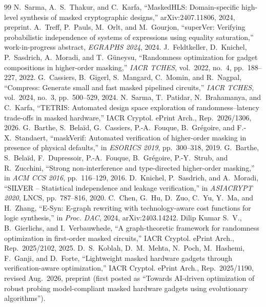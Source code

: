 \documentclass[conference]{IEEEtran}
\begin{document}
\begin{thebibliography}{99}
 N.~Sarma, A.~S.~Thakur, and C.~Karfa, ``MaskedHLS: Domain-specific high-level synthesis of masked cryptographic designs,'' arXiv:2407.11806, 2024, preprint. %
 A.~Treff, P.~Pauls, M.~Orlt, and M.~Gourjon, ``superVer: Verifying probabilistic independence of systems of expressions using equality saturation,'' work-in-progress abstract, \emph{EGRAPHS 2024}, 2024.
 J.~Feldtkeller, D.~Knichel, P.~Sasdrich, A.~Moradi, and T.~G\"uneysu, ``Randomness optimization for gadget compositions in higher-order masking,'' \emph{IACR TCHES}, vol.~2022, no.~4, pp.~188--227, 2022.
 G.~Cassiers, B.~Gigerl, S.~Mangard, C.~Momin, and R.~Nagpal, ``Compress: Generate small and fast masked pipelined circuits,'' \emph{IACR TCHES}, vol.~2024, no.~3, pp.~500--529, 2024.
 N.~Sarma, T.~Patidar, N.~Brahamanya, and C.~Karfa, ``TETRIS: Automated design space exploration of randomness--latency trade-offs in masked hardware,'' IACR Cryptol. ePrint Arch., Rep.~2026/1306, 2026.
 G.~Barthe, S.~Bela\"id, G.~Cassiers, P.-A.~Fouque, B.~Gr\'egoire, and F.-X.~Standaert, ``maskVerif: Automated verification of higher-order masking in presence of physical defaults,'' in \emph{ESORICS 2019}, pp.~300--318, 2019.
 G.~Barthe, S.~Bela\"id, F.~Dupressoir, P.-A.~Fouque, B.~Gr\'egoire, P.-Y.~Strub, and R.~Zucchini, ``Strong non-interference and type-directed higher-order masking,'' in \emph{ACM CCS 2016}, pp.~116--129, 2016.
 D.~Knichel, P.~Sasdrich, and A.~Moradi, ``SILVER -- Statistical independence and leakage verification,'' in \emph{ASIACRYPT 2020}, LNCS, pp.~787--816, 2020.
 C.~Chen, G.~Hu, D.~Zuo, C.~Yu, Y.~Ma, and H.~Zhang, ``E-Syn: E-graph rewriting with technology-aware cost functions for logic synthesis,'' in \emph{Proc. DAC}, 2024, arXiv:2403.14242.
 Dilip Kumar S.~V., B.~Gierlichs, and I.~Verbauwhede, ``A graph-theoretic framework for randomness optimization in first-order masked circuits,'' IACR Cryptol. ePrint Arch., Rep.~2025/2102, 2025.
 D.~S.~Koblah, D.~M.~Mehta, N.~Poch, M.~Hashemi, F.~Ganji, and D.~Forte, ``Lightweight masked hardware gadgets through verification-aware optimization,'' IACR Cryptol. ePrint Arch., Rep.~2025/1190, revised Aug.~2026, preprint (first posted as ``Towards AI-driven optimization of robust probing model-compliant masked hardware gadgets using evolutionary algorithms'').

\end{thebibliography}
\end{document}
